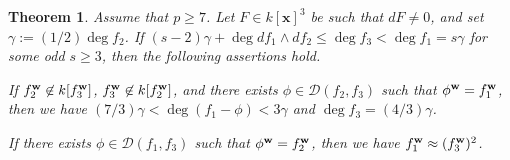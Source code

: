 \documentclass{amsart}
\theoremstyle{plain}
\newtheorem{thm}{Theorem}[section]
\theoremstyle{definition}
\newcommand{\nd}{\noindent}
\newcommand{\x}{{\boldsymbol x}}
\newcommand{\w}{{\bf w}}
\newcommand{\kx}{k[\x]}
\begin{document}
\begin{thm}\label{prop:Exc27,28}
Assume that $p\ge 7$. 
Let $F\in \kx ^3$ be such that $dF\ne 0$, 
and set $\gamma :=(1/2)\deg f_2$. 
If $(s-2)\gamma +\deg df_1\wedge df_2\le \deg f_3<\deg f_1=s\gamma $ 
for some odd $s\ge 3$, 
then the following assertions hold. 


\nd{\rm (i)} 
If $f_2^{\w }\not\in k[f_3^{\w }]$, $f_3^{\w }\not\in k[f_2^{\w }]$, 
and there exists $\phi \in \mathcal{D}(f_2,f_3)$ 
such that $\phi ^{\w }=f_1^{\w }$, 
then we have 
$(7/3)\gamma <\deg (f_1-\phi )<3\gamma $ 
and $\deg f_3=(4/3)\gamma $. 



\nd{\rm (ii)} 
If there exists $\phi \in \mathcal{D}(f_1,f_3)$ 
such that $\phi ^{\w }=f_2^{\w }$, 
then we have $f_1^{\w }\approx (f_3^{\w })^2$. 
\end{thm}
\end{document}
